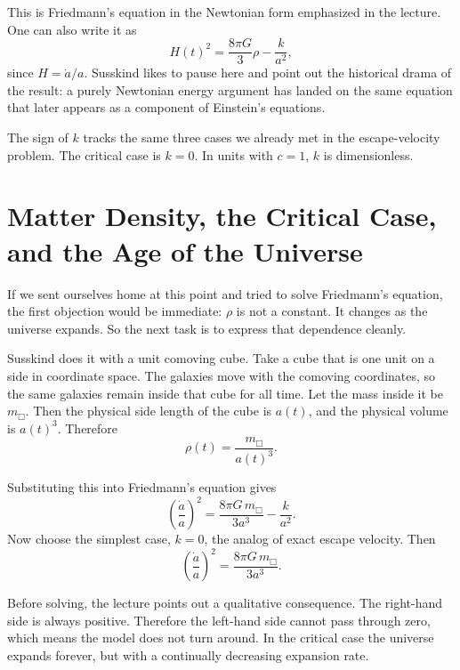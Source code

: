 This is Friedmann's equation in the Newtonian form emphasized in the lecture. One can also write it as
\begin{equation}
H(t)^2=\frac{8\pi G}{3}\rho-\frac{k}{a^2},
\end{equation}
since \(H=\dot a/a\). Susskind likes to pause here and point out the historical drama of the result: a purely Newtonian energy argument has landed on the same equation that later appears as a component of Einstein's equations.

The sign of \(k\) tracks the same three cases we already met in the escape-velocity problem. The critical case is \(k=0\). In units with \(c=1\), \(k\) is dimensionless.

\section{Matter Density, the Critical Case, and the Age of the Universe}

If we sent ourselves home at this point and tried to solve Friedmann's equation, the first objection would be immediate: \(\rho\) is not a constant. It changes as the universe expands. So the next task is to express that dependence cleanly.

Susskind does it with a unit comoving cube. Take a cube that is one unit on a side in coordinate space. The galaxies move with the comoving coordinates, so the same galaxies remain inside that cube for all time. Let the mass inside it be \(m_{\Box}\). Then the physical side length of the cube is \(a(t)\), and the physical volume is \(a(t)^3\). Therefore
\begin{equation}
\rho(t)=\frac{m_{\Box}}{a(t)^3}.
\end{equation}

Substituting this into Friedmann's equation gives
\begin{equation}
\left(\frac{\dot a}{a}\right)^2=\frac{8\pi G\,m_{\Box}}{3a^3}-\frac{k}{a^2}.
\end{equation}
Now choose the simplest case, \(k=0\), the analog of exact escape velocity. Then
\begin{equation}
\left(\frac{\dot a}{a}\right)^2=\frac{8\pi G\,m_{\Box}}{3a^3}.
\end{equation}

Before solving, the lecture points out a qualitative consequence. The right-hand side is always positive. Therefore the left-hand side cannot pass through zero, which means the model does not turn around. In the critical case the universe expands forever, but with a continually decreasing expansion rate.

